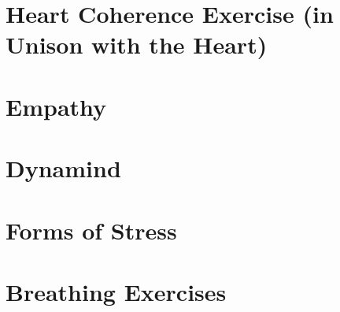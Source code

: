 \documentclass[../main.tex]{subfiles}
\begin{document}
\chapter[Heart Coherence Exercise]{Heart Coherence Exercise (in Unison with the Heart)}


\chapter{Empathy}


\chapter{Dynamind}


\chapter{Forms of Stress}


\chapter{Breathing Exercises}

\end{document}
